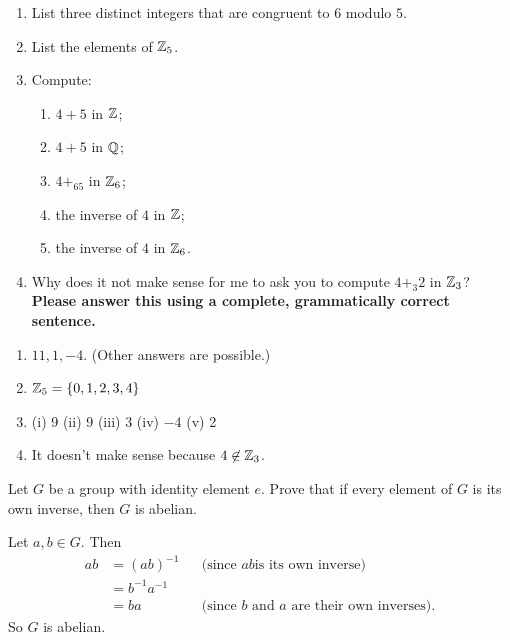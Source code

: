 \begin{exercise}[ID=2P]
\begin{enumerate}
\item List three distinct integers that are congruent to $6$ modulo $5$.
\item List the elements of $\mathbb{Z}_5$.
\item Compute: \begin{enumerate}
\item $4+5$ in $\mathbb{Z}$;
\item $4+5$ in $\mathbb{Q}$;
\item $4+_65$ in $\mathbb{Z}_6$;
\item the inverse of $4$ in $\mathbb{Z}$;
\item the inverse of $4$ in $\mathbb{Z}_6$.
\end{enumerate}
\item Why does it not make sense for me to ask you to compute $4+_3 2$ in $\mathbb{Z}_3$? \textbf{Please answer this using a complete, grammatically correct sentence.}

\end{enumerate}
\end{exercise}

\begin{solution}[print=true]
\begin{enumerate}
\item $11, 1, -4$. (Other answers are possible.)
\item  $\mathbb{Z}_5=\{0,1,2,3,4\}$
\item (i) 9 \quad (ii) 9 \quad (iii) 3 \quad (iv) $-4$ \quad (v) 2
\item It doesn't make sense because $4\not\in \mathbb{Z}_3$.
\end{enumerate}
\end{solution}


\begin{exercise}[ID=2O]
Let $G$ be a group with identity element $e$.  Prove that if every element of $G$ is its own inverse, then $G$ is abelian.

\end{exercise}

\begin{solution}[print=true]
Let $a,b\in G$.  Then
\begin{align*}ab&=(ab)^{-1}&&\text{(since $ab$
is its own inverse)}\\
&=b^{-1}a^{-1}&&\\
&=ba &&\text{(since $b$ and $a$ are their own
inverses)}.\end{align*} So $G$ is abelian.
\end{solution}


